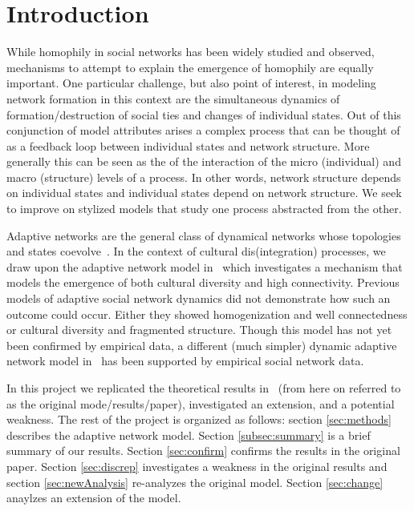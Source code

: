 \section{Introduction}

    While homophily in social networks has been widely studied and observed,
    mechanisms to
    attempt to explain the emergence of homophily are equally important.
    One particular challenge, but also point of interest, in modeling
    network formation in this context are the simultaneous dynamics of
    formation/destruction of social ties and changes of individual states.
    Out of this conjunction of model attributes arises a complex process that can
    be thought of as a feedback loop between individual states and network structure.
    More generally this can be seen as the of the interaction of
    the micro (individual) and macro (structure) levels of a process.
    In other words, network structure depends on individual states and individual
    states depend on network structure.
    We seek to improve on stylized models that study one process abstracted from the other.

    Adaptive networks are the general class of dynamical networks whose topologies
    and states coevolve~\citep{sayama2013modeling}.
    In the context of cultural dis(integration) processes, we draw upon the
    adaptive network model in~\citep{social-frag} which investigates a mechanism that models the emergence of
    both cultural diversity and high connectivity.
    Previous models of adaptive social network dynamics did not demonstrate how
    such an outcome could occur.
    Either they showed homogenization and well connectedness or cultural diversity and
    fragmented structure.
    Though this model has not yet been confirmed by empirical
    data, a different (much simpler) dynamic adaptive network model in~\citep{brot2012feedback}
    has been supported by empirical social network data.

    In this project we replicated the theoretical results in~\citep{social-frag} (from here on referred to as the
    original mode/results/paper),
    investigated an extension, and a potential weakness.
    The rest of the project is organized as follows: section \ref{sec:methods} describes
    the adaptive network model.
    Section \ref{subsec:summary} is a brief summary of our results.
    Section \ref{sec:confirm} confirms the results in the original paper.
    Section \ref{sec:discrep} investigates a weakness in the original results
    and section \ref{sec:newAnalysis} re-analyzes the original model.
    Section \ref{sec:change} anaylzes an extension of the model.

